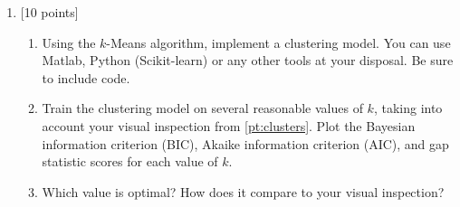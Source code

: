 \documentclass[12pt]{article}
\newenvironment{problem}[2][Problem:]{\begin{trivlist}
\item[\hskip \labelsep {\bfseries #1}\hskip \labelsep {\bfseries #2.}]}{\end{trivlist}}
\begin{document}
\begin{problem}{$K$-Means Clustering [15 points]}
\begin{enumerate}
    \item {[10 points]} 
    \begin{enumerate}
    	\item Using the $k$-Means algorithm, implement a clustering model. You can use Matlab, Python (Scikit-learn) or any other tools at your disposal. Be sure to include code. 
	\item Train the clustering model on several reasonable values of $k$, taking into account your visual inspection from \ref{pt:clusters}. Plot the Bayesian information criterion (BIC), Akaike information criterion (AIC), and gap statistic scores for each value of $k$. 
	\item Which value is optimal? How does it compare to your visual inspection?
    \end{enumerate}

\end{enumerate}
\end{problem}
\end{document}
